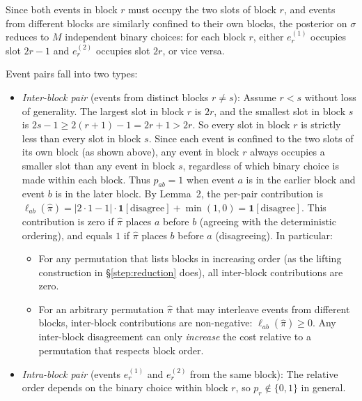 \documentclass[11pt]{article}
\begin{document}
Since both events in block $r$ must occupy the two slots of block $r$, and events from different blocks are similarly confined to their own blocks, the posterior on $\sigma$ reduces to $M$ independent binary choices: for each block $r$, either $e_r^{(1)}$ occupies slot $2r - 1$ and $e_r^{(2)}$ occupies slot $2r$, or vice versa.

Event pairs fall into two types:

\begin{itemize}
\item \emph{Inter-block pair} (events from distinct blocks $r \ne s$): Assume $r < s$ without loss of generality. The largest slot in block $r$ is $2r$, and the smallest slot in block $s$ is $2s - 1 \ge 2(r+1) - 1 = 2r + 1 > 2r$. So every slot in block $r$ is strictly less than every slot in block $s$. Since each event is confined to the two slots of its own block (as shown above), any event in block $r$ always occupies a smaller slot than any event in block $s$, regardless of which binary choice is made within each block. Thus $p_{ab} = 1$ when event $a$ is in the earlier block and event $b$ is in the later block. By Lemma~2, the per-pair contribution is $\ell_{ab}(\hat{\pi}) = |2 \cdot 1 - 1| \cdot \mathbf{1}[\text{disagree}] + \min(1, 0) = \mathbf{1}[\text{disagree}]$. This contribution is zero if $\hat{\pi}$ places $a$ before $b$ (agreeing with the deterministic ordering), and equals $1$ if $\hat{\pi}$ places $b$ before $a$ (disagreeing). In particular:
\begin{itemize}
\item For any permutation that lists blocks in increasing order (as the lifting construction in \S\ref{step:reduction} does), all inter-block contributions are zero.
\item For an arbitrary permutation $\hat{\pi}$ that may interleave events from different blocks, inter-block contributions are non-negative: $\ell_{ab}(\hat{\pi}) \ge 0$. Any inter-block disagreement can only \emph{increase} the cost relative to a permutation that respects block order.
\end{itemize}

\item \emph{Intra-block pair} (events $e_r^{(1)}$ and $e_r^{(2)}$ from the same block): The relative order depends on the binary choice within block $r$, so $p_r \notin \{0, 1\}$ in general.
\end{itemize}
\end{document}
